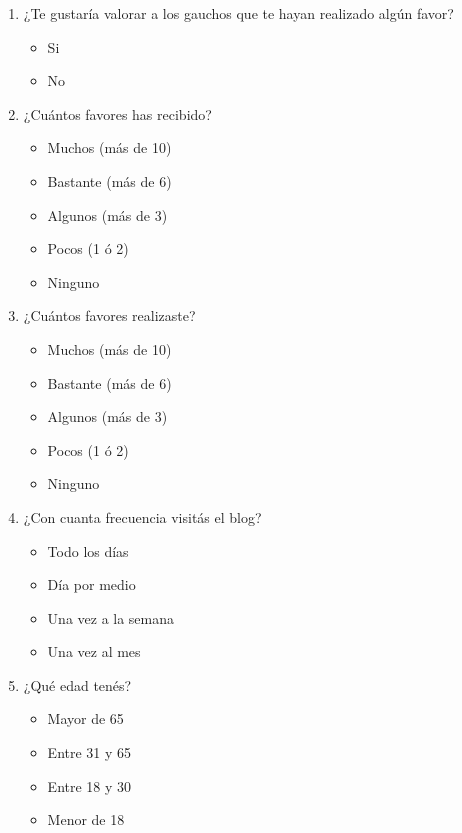\documentclass[a4paper,10pt]{article}
\begin{document}
\begin{enumerate}
    \item ¿Te gustaría valorar a los gauchos que te hayan realizado algún favor?
    \begin{itemize}
        \item Si
        \item No
    \end{itemize}
    
    \item ¿Cuántos favores has recibido?
    \begin{itemize}
        \item Muchos (más de 10)
        \item Bastante (más de 6)
        \item Algunos (más de 3)
        \item Pocos (1 ó 2)
        \item Ninguno
    \end{itemize}
    
    \item ¿Cuántos favores realizaste?
    \begin{itemize}
        \item Muchos (más de 10)
        \item Bastante (más de 6)
        \item Algunos (más de 3)
        \item Pocos (1 ó 2)
        \item Ninguno
    \end{itemize}
    
    \item ¿Con cuanta frecuencia visitás el blog?
    \begin{itemize}
        \item Todo los días
        \item Día por medio
        \item Una vez a la semana
        \item Una vez al mes
    \end{itemize}
    
    \item ¿Qué edad tenés?
    \begin{itemize}
        \item Mayor de 65
        \item Entre 31 y 65
        \item Entre 18 y 30
        \item Menor de 18
    \end{itemize}
    

\end{enumerate}
\end{document}
